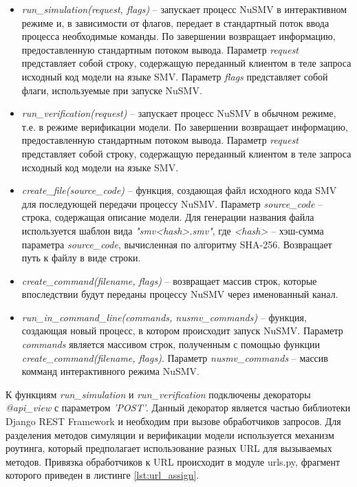 \begin{itemize}
	\item \textit{run\_simulation(request, flags)} -- запускает процесс NuSMV в интерактивном режиме и, в зависимости от флагов, передает в стандартный поток ввода процесса необходимые команды. По завершении возвращает информацию, предоставленную стандартным потоком вывода. Параметр \textit{request} представляет собой строку, содержащую переданный клиентом в теле запроса исходный код модели на языке SMV. Параметр \textit{flags} представляет собой флаги, используемые при запуске NuSMV.
	\item \textit{run\_verification(request)} -- запускает процесс NuSMV в обычном режиме, т.е. в режиме верификации модели. По завершении возвращает информацию, предоставленную стандартным потоком вывода. Параметр \textit{request} представляет собой строку, содержащую переданный клиентом в теле запроса исходный код модели на языке SMV. 
	\item \textit{create\_file(source\_code)} -- функция, создающая файл исходного кода SMV для последующей передачи процессу NuSMV. Параметр \textit{source\_code} -- строка, содержащая описание модели. Для генерации названия файла используется шаблон вида \textit{"smv<hash>.smv"}, где \textit{<hash>} -- хэш-сумма параметра \textit{source\_code}, вычисленная по алгоритму SHA-256. Возвращает путь к файлу в виде строки.
	\item \textit{create\_command(filename, flags)} -- возвращает массив строк, которые впоследствии будут переданы процессу NuSMV через именованный канал.
	\item \textit{run\_in\_command\_line(commands, nusmv\_commands)} -- функция, создающая новый процесс, в котором происходит запуск NuSMV. Параметр \textit{commands} является массивом строк, полученным с помощью функции \textit{create\_command(filename, flags)}. Параметр \textit{nusmv\_commands} -- массив комманд интерактивного режима NuSMV.
\end{itemize}

К функциям \textit{run\_simulation} и \textit{run\_verification} подключены декораторы \textit{@api\_view} с параметром \textit{'POST'}. Данный декоратор является частью библиотеки Django REST Framework и необходим при вызове обработчиков запросов. Для разделения методов симуляции и верификации модели используется механизм роутинга, который предполагает использование разных URL для вызываемых методов. Привязка обработчиков к URL происходит в модуле urls.py, фрагмент которого приведен в листинге \ref{lst:url_assign}.

